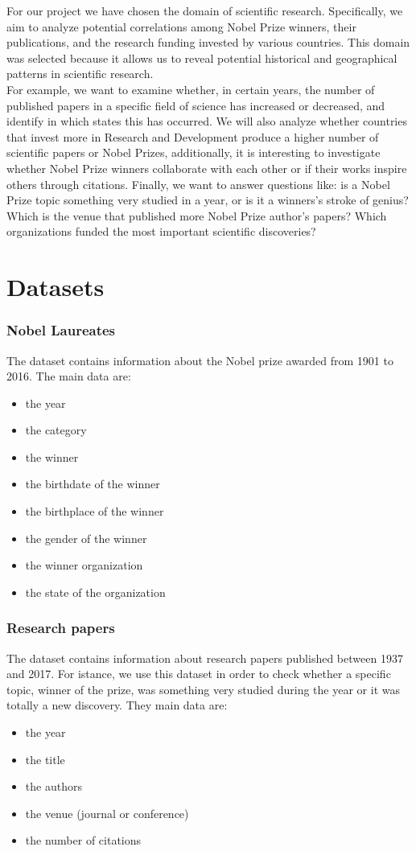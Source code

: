 \documentclass{article}
\begin{document}
For our project we have chosen the domain of scientific research. Specifically, we aim to analyze potential correlations among Nobel Prize winners,
their publications, and the research funding invested by various countries. This domain was selected because it allows us to reveal potential historical
and geographical patterns in scientific research. \\
For example, we want to examine whether, in certain years, the number of published papers in a specific field of science has increased or decreased, and
identify in which states this has occurred. We will also analyze whether countries that invest more in Research and Development produce a higher number
of scientific papers or Nobel Prizes, additionally, it is interesting to investigate whether Nobel Prize winners
collaborate with each other or if their works inspire others through citations. Finally, we want to answer questions like: is a Nobel Prize topic something
very studied in a year, or is it a winners's stroke of genius? Which is the venue that published more Nobel Prize author's papers? Which organizations
funded the most important scientific discoveries?
\section*{Datasets}
\subsubsection*{Nobel Laureates}
The dataset contains information about the Nobel prize awarded from 1901 to 2016. The main data are:
\begin{multicols}{2}
  \begin{itemize}
    \item the year
    \item the category
    \item the winner
    \item the birthdate of the winner
    \item the birthplace of the winner
    \item the gender of the winner
    \item the winner organization
    \item the state of the organization
  \end{itemize}
  \end{multicols}
\subsubsection*{Research papers}
The dataset contains information about research papers published between 1937 and 2017. For istance, we use this dataset in order to check whether a
specific topic, winner of the prize, was something very studied during the year or it was totally a new discovery. They main data are:
\begin{itemize}
	\item the year
	\item the title
	\item the authors
	\item the venue (journal or conference)
	\item the number of citations
\end{itemize}
\end{document}
